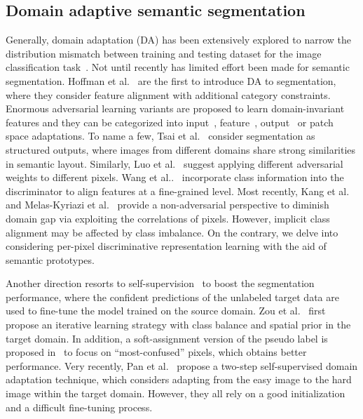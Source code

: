 \documentclass[runningheads]{llncs}
\begin{document}
\subsection{Domain adaptive semantic segmentation} Generally, domain adaptation (DA) has been extensively explored to narrow the distribution mismatch between training and testing dataset for the image classification task~\cite{ganin2015dann,long2015dan,long2018conditional,peng2019moment,tzeng2015simultaneous,xie2018learning,JADA,GDCAN}. Not until recently has limited effort been made for semantic segmentation. Hoffman et al.~\cite{hoffman2016fcns} are the first to introduce DA to segmentation, where they consider feature alignment with additional category constraints. Enormous adversarial learning variants are proposed to learn domain-invariant features and they can be categorized into  input~\cite{Hoffman_cycada2017,li2019bidirectional}, feature~\cite{du2019ssf-dan,wang2020differential}, output~\cite{luo2019taking,tsai2018learning,yang2020adversarial} or patch~\cite{tsai2019domain} space adaptations. To name a few, Tsai et al.~\cite{tsai2018learning} consider segmentation as structured outputs, where images from different domains share strong similarities in semantic layout. Similarly, Luo et al.~\cite{luo2019taking} suggest applying different adversarial weights to different pixels. Wang et al..~\cite{wang2020class} incorporate class information into the discriminator to align features at a fine-grained level. Most recently, Kang et al.~\cite{kang2020pixel} and Melas-Kyriazi et al.~\cite{pixmatch2021_CVPR} provide a non-adversarial perspective to diminish domain gap via exploiting the correlations of pixels. However, implicit class alignment may be affected by class imbalance. On the contrary, we delve into considering per-pixel discriminative representation learning with the aid of semantic prototypes.

Another direction resorts to self-supervision~\cite{wang2021uncertainty,ProDA_2021_CVPR,lian2019pycda,pan2020unsupervised,Zhang_2017_ICCV,zou2018unsupervised,zou2019confidence,wang2021domain} to boost the segmentation performance, where the confident predictions of the unlabeled target data are used to fine-tune the model trained on the source domain. Zou et al.~\cite{zou2018unsupervised} first propose an iterative learning strategy with class balance and spatial prior in the target domain. In addition, a soft-assignment version of the pseudo label is proposed in~\cite{vu2019advent} to focus on ``most-confused'' pixels, which obtains better performance. Very recently, Pan et al.~\cite{pan2020unsupervised} propose a two-step self-supervised domain adaptation technique, which considers adapting from the easy image to the hard image within the target domain. However, they all rely on a good initialization and a difficult fine-tuning process. 
\end{document}
